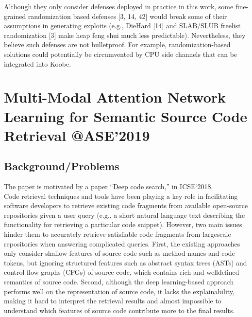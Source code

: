 Although they only consider defenses deployed in practice in this work, some fine-grained randomization based defenses [3, 14, 42] would break some of their assumptions in generating exploits (e.g., DieHard [14] and SLAB/SLUB freelist randomization [3] make heap feng shui much less predictable). Nevertheless, they believe such defenses are not bulletproof. For example, randomization-based solutions could potentially be circumvented by CPU side channels that can be integrated into Koobe.  
\newpage

\section{Multi-Modal Attention Network Learning for Semantic Source Code Retrieval @ASE'2019}
\subsection{Background/Problems}
The paper is motivated by a paper  “Deep code search,” in ICSE‘2018. \\
Code retrieval techniques and tools have been playing a key role in facilitating software developers to retrieve existing code fragments from available open-source repositories given a user query (e.g., a short natural language text describing the functionality for retrieving a particular code snippet). However, two main issues hinder them to accurately retrieve satisfiable code fragments from largescale repositories when answering complicated queries. First, the existing approaches only consider shallow features of source code such as method names and code tokens, but ignoring structured features such as abstract syntax trees (ASTs) and control-flow graphs (CFGs) of source code, which contains rich and welldefined semantics of source code. Second, although the deep learning-based approach performs well on the representation of source code, it lacks the explainability, making it hard to interpret the retrieval results and almost impossible to understand which features of source code contribute more to the final results.

